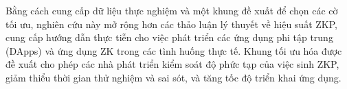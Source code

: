     Bằng cách cung cấp dữ liệu thực nghiệm và một khung đề xuất để chọn các cờ tối ưu, nghiên cứu này mở rộng hơn các thảo luận lý thuyết về hiệu suất ZKP, cung cấp hướng dẫn thực tiễn cho việc phát triển các ứng dụng phi tập trung (DApps) và ứng dụng ZK trong các tình huống thực tế. Khung tối ưu hóa được đề xuất cho phép các nhà phát triển kiểm soát độ phức tạp của việc sinh ZKP, giảm thiểu thời gian thử nghiệm và sai sót, và tăng tốc độ triển khai ứng dụng.



